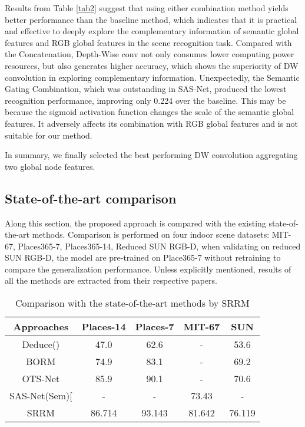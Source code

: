 \documentclass[conference]{IEEEtran}
\begin{document}
Results from Table \ref{tab2} suggest that using either combination method yields better performance than the baseline method, which indicates that it is practical and effective to deeply explore the complementary information of semantic global features and RGB global features in the scene recognition task. Compared with the Concatenation, Depth-Wise conv not only consumes lower computing power resources, but also generates higher accuracy, which shows the superiority of DW convolution in exploring complementary information. Unexpectedly, the Semantic Gating Combination, which was outstanding in SAS-Net, produced the lowest recognition performance, improving only 0.224 over the baseline. This may be because the sigmoid activation function changes the scale of the semantic global features. It adversely affects its combination with RGB global features and is not suitable for our method.

In summary, we finally selected the best performing DW convolution aggregating two global node features.

\subsection{State-of-the-art comparison}

Along this section, the proposed approach is compared with the existing state-of-the-art methods. Comparison is performed on four indoor scene datasets: MIT-67\cite{ref8}, Places365-7\cite{ref14}, Places365-14\cite{ref14}, Reduced SUN RGB-D\cite{ref30}, when validating on reduced SUN RGB-D, the model are pre-trained on Place365-7 without retraining to compare the generalization performance. Unless explicitly mentioned, results of all the methods are extracted from their respective papers.

\begin{table}[htbp]\centering
    \caption{Comparison with the state-of-the-art methods by SRRM}
    \begin{tabular}{ccccc}
    \hline
        \textbf{Approaches} & \textbf{Places-14} & \textbf{Places-7} & \textbf{MIT-67 }& \textbf{SUN}  \\ \hline
        Deduce()\cite{ref18}  & 47.0 & 62.6 & - & 53.6  \\ 
        BORM\cite{ref20}  & 74.9 & 83.1 & - & 69.2  \\ 
        OTS-Net\cite{ref16}  & 85.9 & 90.1 & - & 70.6  \\ 
        SAS-Net(Sem)[\cite{ref17}  & - & - & 73.43 & -  \\ 
        SRRM & 86.714 & 93.143 & 81.642 & 76.119  \\ \hline
    \end{tabular}
    \label{tab3}
\end{table}
\end{document}
